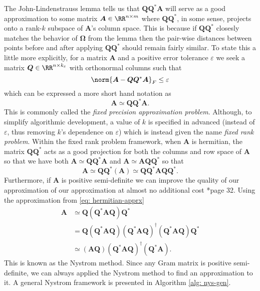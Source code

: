 The John-Lindenstrauss lemma tells us that $\bm{Q} \bm{Q}^{\ast} \bm{A}$ will serve as a good approximation to some matrix $\bm{A} \in \RR^{n \times m}$ where $\bm{Q} \bm{Q}^{\ast}$, in some sense, projects onto a rank-$k$ subspace of $\bm{A}$'s column space. This is because if $\bm{Q} \bm{Q}^{\ast}$ closesly matches the behavior of $\bm{\Omega}$ from the lemma then the pair-wise distances between points before and after applying $\bm{Q} \bm{Q}^{\ast}$ should remain fairly similar. To state this a little more explicitly, for a matrix $\bm{A}$ and a positive error tolerance $\varepsilon$ we seek a matrix $\bm{Q} \in \RR^{n \times k_{\varepsilon}}$ with orthonormal columns such that
\begin{equation*}
    \norm{\bm{A} - \bm{Q} \bm{Q}^{\ast} \bm{A}}_{F} \leq \varepsilon
\end{equation*}
which can be expressed a more short hand notation as
\begin{equation} \label{eq: nys-Q-cond}
    \bm{A} \simeq \bm{Q} \bm{Q}^{\ast} \bm{A}.
\end{equation}
This is commonly called the {\it fixed precision approximation problem}. Although, to simplify algorithmic development, a value of $k$ is specified in advanced (instead of $\varepsilon$, thus removing $k$'s dependence on $\varepsilon$) which is instead given the name {\it fixed rank problem}. Within the fixed rank problem framework, when $\bm{A}$ is hermitian, the matrix $\bm{Q} \bm{Q}^{\ast}$ acts as a good projection for both the columns and row space of $\bm{A}$ so that we have both $\bm{A} \simeq \bm{Q} \bm{Q}^{\ast} \bm{A}$ and $\bm{A} \simeq \bm{A} \bm{Q} \bm{Q}^{\ast}$ so that
\begin{equation} \label{eq: hermitian-apprx}
    \bm{A} \simeq \bm{Q} \bm{Q}^{\ast} \left( \bm{A} \right) \simeq \bm{Q} \bm{Q}^{\ast} \bm{A} \bm{Q} \bm{Q}^{\ast}.
\end{equation}
Furthermore, if $\bm{A}$ is positive semi-definite we can improve the quality of our approximation of our approximation at almost no additional cost \cite{halko2011finding}*{page 32}. Using the approximation from \ref{eq: hermitian-apprx}
\begin{align} \label{eq: nys-apprx}
    \bm{A} & \simeq \bm{Q} \left( \bm{Q}^{\ast} \bm{A} \bm{Q} \right) \bm{Q}^{\ast} \nonumber                                                                                            \\
           & = \bm{Q} \left( \bm{Q}^{\ast} \bm{A} \bm{Q} \right) \left( \bm{Q}^{\ast} \bm{A} \bm{Q} \right)^{\dagger} \left( \bm{Q}^{\ast} \bm{A} \bm{Q} \right) \bm{Q}^{\ast} \nonumber \\
           & \simeq \left( \bm{A} \bm{Q} \right) \left( \bm{Q}^{\ast} \bm{A} \bm{Q} \right)^{\dagger} \left( \bm{Q}^{\ast} \bm{A} \right).
\end{align}
This is known as the Nystrom method. Since any Gram matrix is positive semi-definite, we can always applied the Nystrom method to find an approximation to it. A general Nystrom framework is presented in Algorithm \ref{alg: nys-gen}.

